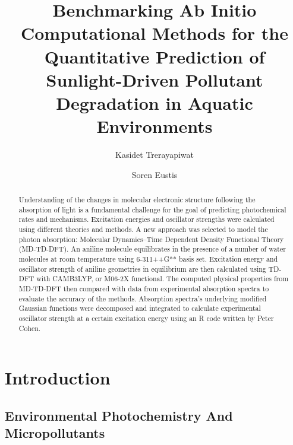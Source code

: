\documentclass[
journal=jpcbfk, %
manuscript=article]{achemso}
\author{Kasidet Trerayapiwat}
\affiliation[Bowdoin College]
{Department of Chemistry, Bowdoin College, Brunswick, ME}
\author{Soren Eustis}
\affiliation[Bowdoin College]
{Department of Chemistry, Bowdoin College, Brunswick, ME}
\title[\texttt{achemso} demonstration]
{Benchmarking Ab Initio Computational Methods for the Quantitative Prediction of Sunlight-Driven Pollutant Degradation in Aquatic Environments}
\begin{document}
\begin{abstract}
Understanding of the changes in molecular electronic structure following the absorption of light is a fundamental challenge for the goal of predicting photochemical rates and mechanisms. Excitation energies and oscillator strengths were calculated using different theories and methods. A new approach was selected to model the photon absorption: Molecular Dynamics–Time Dependent Density Functional Theory (MD-TD-DFT). An aniline molecule equilibrates in the presence of a number of water molecules at room temperature using 6-311++G** basis set. Excitation energy and oscillator strength of aniline geometries in equilibrium are then calculated using TD-DFT with CAMB3LYP, or M06-2X functional. The computed physical properties from MD-TD-DFT then compared with data from experimental absorption spectra to evaluate the accuracy of the methods. Absorption spectra’s underlying modified Gaussian functions were decomposed and integrated to calculate experimental oscillator strength at a certain excitation energy using an R code written by Peter Cohen.
\end{abstract}


\section{Introduction}

\subsection{Environmental Photochemistry And Micropollutants}
\end{document}

